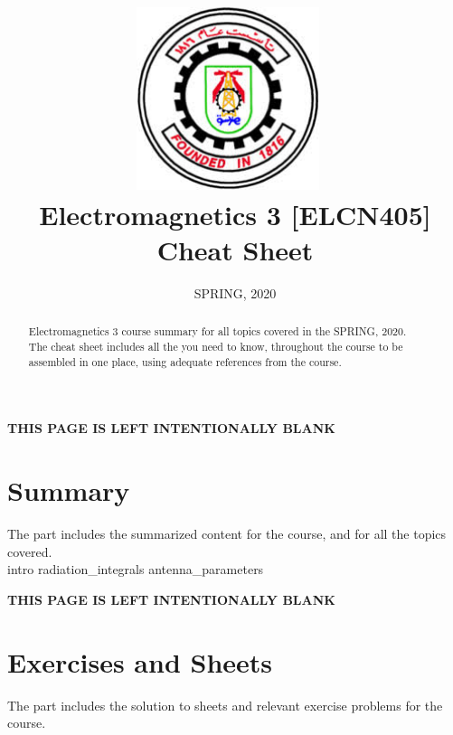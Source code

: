 \documentclass[class=article, crop=false]{standalone}
\title{
    \includegraphics[width=0.4\textwidth]{CUFELOGO.jpeg}~\\[1cm]
    Electromagnetics 3 [ELCN405] Cheat Sheet
}
\date{SPRING, 2020}
\begin{document}
    \clearpage
    \maketitle
    \thispagestyle{empty}
    \newpage
    \setcounter{page}{1}
    \begin{abstract}
    Electromagnetics 3 course\cite{ELCN405} summary for all topics covered in the SPRING, 2020. \\
    The cheat sheet includes all the you need to know, throughout the course to be assembled in one place, using
    adequate references from the course\cite{ELCN405}.

    \end{abstract}
    \newpage
    \tableofcontents
    \newpage
    \listoffigures
    \newpage
    \listoftables
    \newpage


    \thispagestyle{empty}
    \vspace*{\fill}
    \begin{center}
        \textbf{
            \uppercase{this page is left intentionally blank}
        }
    \end{center}
    \vspace*{\fill}

    \newpage
    \setcounter{page}{1}
    \part{Summary}
    The part includes the summarized content for the course\cite{ELCN405}, and for all the topics covered. \\
    \newpage
    {intro}
    \newpage
    {radiation_integrals}
    \newpage
    {antenna_parameters}

    \newpage
    \thispagestyle{empty}
    \vspace*{\fill}
    \begin{center}
        \textbf{
            \uppercase{this page is left intentionally blank}
        }
    \end{center}
    \vspace*{\fill}
    \newpage
    \part{Exercises and Sheets}
    The part includes the solution to sheets and relevant exercise problems for the course\cite{ELCN405}.\\
    \newpage

    \newpage
    \setcounter{page}{1}
    
    
\end{document}
